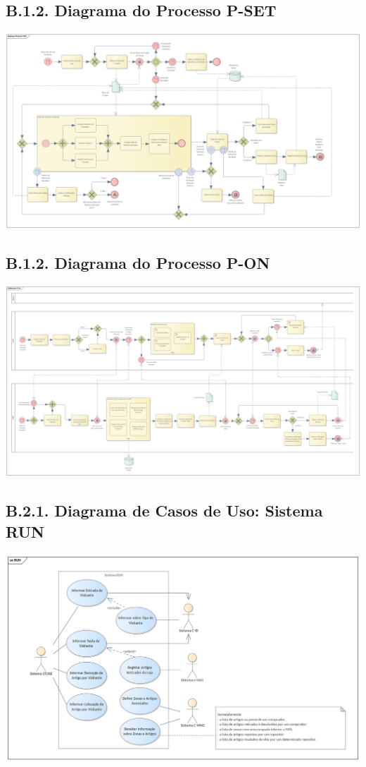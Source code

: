 \documentclass[12pt,a4paper]{article}
\begin{document}
\begin{landscape}
	\section*{B.1.2. Diagrama do Processo P-SET}
	\includegraphics[width=1.59\textwidth]{../BPMN_P-SET.png}
\end{landscape}

\begin{landscape}
	\section*{B.1.2. Diagrama do Processo P-ON}
	\includegraphics[width=1.59\textwidth]{../BPMN_P-ON.png}
\end{landscape}

\begin{landscape}
	\section*{B.2.1. Diagrama de Casos de Uso: Sistema RUN}
	\includegraphics[width=1.59\textwidth]{../UC_RUN.png}
\end{landscape}
\end{document}
